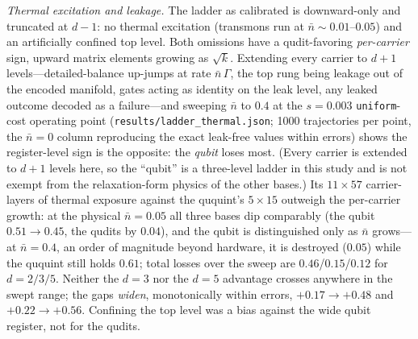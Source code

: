 \documentclass[aps,pra,reprint,superscriptaddress,nofootinbib,floatfix]{revtex4-2}
\begin{document}
\emph{Thermal excitation and leakage.} The ladder as calibrated is
downward-only and truncated at $d-1$: no thermal excitation
(transmons run at $\bar n\sim0.01$--$0.05$) and an artificially
confined top level. Both omissions have a qudit-favoring
\emph{per-carrier} sign, upward matrix elements growing as
$\sqrt{k}$. Extending every carrier to $d+1$ levels---detailed-balance
up-jumps at rate $\bar n\,\Gamma$, the top rung being leakage out of
the encoded manifold, gates acting as identity on the leak level,
any leaked outcome decoded as a failure---and sweeping $\bar n$ to
$0.4$ at the $s=0.003$ \texttt{uniform}-cost operating point
(\texttt{results/ladder\_thermal.json}; 1000 trajectories per point,
the $\bar n=0$ column reproducing the exact leak-free values within
errors) shows the register-level sign is the opposite: the
\emph{qubit} loses most. (Every carrier is extended to $d+1$ levels
here, so the ``qubit'' is a three-level ladder in this study and is
not exempt from the relaxation-form physics of the other bases.) Its
$11\times57$ carrier-layers of thermal
exposure against the ququint's $5\times15$ outweigh the per-carrier
growth: at the physical $\bar n=0.05$ all three bases dip
comparably (the qubit $0.51\to0.45$, the qudits by $0.04$), and the
qubit is distinguished only as $\bar n$ grows---at
$\bar n=0.4$, an order of magnitude beyond hardware, it is
destroyed ($0.05$) while the ququint still holds $0.61$; total
losses over the sweep are $0.46$/$0.15$/$0.12$ for $d=2/3/5$.
Neither the
$d=3$ nor the $d=5$ advantage crosses anywhere in the swept range;
the gaps \emph{widen}, monotonically within errors,
$+0.17\to+0.48$ and
$+0.22\to+0.56$. Confining the top level was a bias against the wide
qubit register, not for the qudits.
\end{document}
